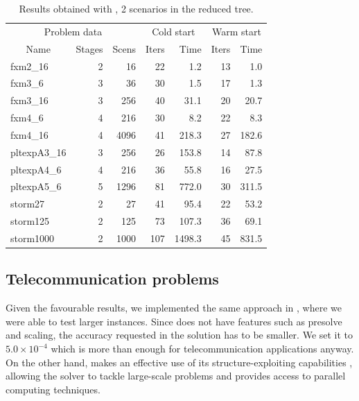 \begin{table}[ht]
  \begin{center}
    \begin{tabular}{|l|r|r||r|r||r|r|} \hline
      \multicolumn{3}{|c||}{Problem data}&\multicolumn{2}{c||}{Cold start}&\multicolumn{2}{c|}{Warm start}\\
      \multicolumn{1}{|c|}{Name} & Stages & Scens & Iters & Time & Iters & Time \\ \hline \hline
fxm2\_16     &  2 &   16 &  22 &   1.2 & 13 &   1.0 \\
fxm3\_6      &  3 &   36 &  30 &   1.5 & 17 &   1.3 \\
fxm3\_16     &  3 &  256 &  40 &  31.1 & 20 &  20.7 \\
fxm4\_6      &  4 &  216 &  30 &   8.2 & 22 &   8.3 \\
fxm4\_16     &  4 & 4096 &  41 & 218.3 & 27 & 182.6 \\ \hline
pltexpA3\_16 &  3 &  256 &  26 & 153.8 & 14 &  87.8 \\
pltexpA4\_6  &  4 &  216 &  36 &  55.8 & 16 &  27.5 \\
pltexpA5\_6  &  5 & 1296 &  81 & 772.0 & 30 & 311.5 \\ \hline
storm27      &  2 &   27 &  41 &  95.4 & 22 &  53.2 \\
storm125     &  2 &  125 &  73 & 107.3 & 36 &  69.1 \\
storm1000    &  2 & 1000 & 107 &1498.3 & 45 & 831.5 \\ \hline
    \end{tabular}
    \caption{Results obtained with \HOPDM, 2 scenarios in the reduced tree.}
    \label{table:hopdm}
  \end{center} \vspace{-3ex}
\end{table}

%
%
\subsection{Telecommunication problems}

Given the favourable results, we implemented the same approach 
in \OOPS \cite{GondzioSarkissian,GondzioGrothey07}, where we were 
able to test larger instances. 
Since \OOPS does not have features such as presolve and scaling,
the accuracy requested in the solution has to be smaller. We set it to
$5.0 \times 10^{-4}$ which is more than enough for telecommunication
applications anyway.
On the other hand, \OOPS makes an effective use of its structure-exploiting
capabilities \cite{GondzioSarkissian,GondzioGrothey07},
allowing the solver to tackle large-scale problems 
and provides access to parallel computing techniques.

